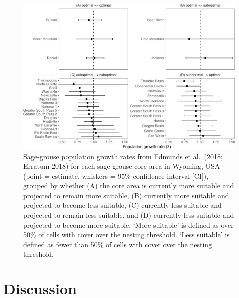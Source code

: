 \documentclass[
  12pt,
]{article}
\begin{document}
\begin{figure}
\centering
\includegraphics{sageCastManuscript_files/figure-latex/lambda-compares-1.pdf}
\caption{\label{fig:lambda-compares}Sage-grouse population growth rates from Edmunds et al.~(2018; Erratum 2018) for each sage-grouse core area in Wyoming, USA (point = estimate, whiskers = 95\% confidence interval {[}CI{]}), grouped by whether (A) the core area is currently more suitable and projected to remain more suitable, (B) currently more suitable and projected to become less suitable, (C) currently less suitable and projected to remain less suitable, and (D) currently less suitable and projected to become more suitable. `More suitable' is defined as over 50\% of cells with cover over the nesting threshold. `Less suitable' is defined as fewer than 50\% of cells with cover over the nesting threshold.}
\end{figure}

\hypertarget{discussion}{%
\section{Discussion}\label{discussion}}
\end{document}
